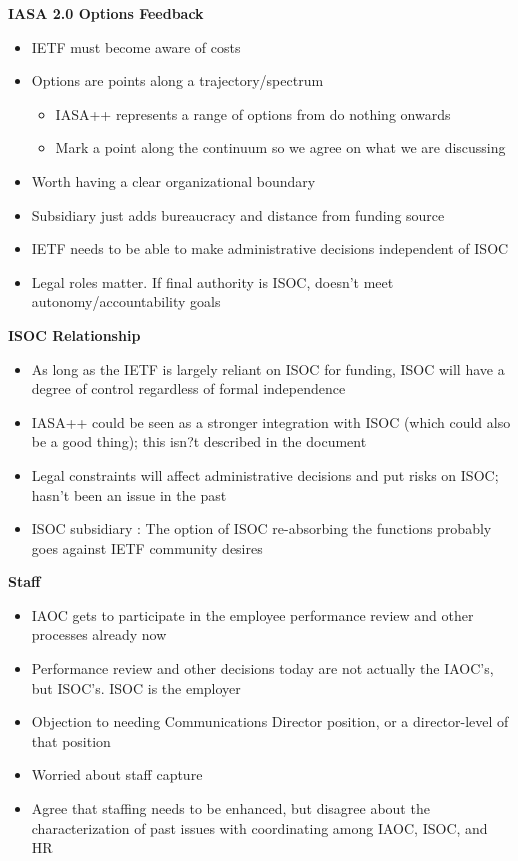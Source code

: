 \documentclass[helvetica,a4paper,landscape]{seminar}
\newcommand{\heading}[1]{%
  \begin{center} 
    \large\bf 
    #1 
  \end{center} 
  \vspace{.4 in}}
\begin{document}
\begin{slide}

\heading{IASA 2.0 Options Feedback}
{\footnotesize
\begin{itemize}
\item IETF must become aware of costs
\item Options are points along a trajectory/spectrum
\begin{itemize}
\item IASA++ represents a range of options from do nothing onwards
\item Mark a point along the continuum so we agree on what we are discussing
\end{itemize}
\item Worth having a clear organizational boundary
\item Subsidiary just adds bureaucracy and distance from funding source
\item IETF needs to be able to make administrative decisions independent of ISOC
\item Legal roles matter. If final authority is ISOC, doesn't meet autonomy/accountability goals 
\end{itemize}
}
\end{slide}

\begin{slide}

\heading{ISOC Relationship}
\begin{itemize}
\item As long as the IETF is largely reliant on ISOC for funding, ISOC will have a degree of control regardless of formal independence
\item IASA++ could be seen as a stronger integration with ISOC (which could also be a good thing); this isn?t described in the document
\item Legal constraints will affect administrative decisions and put risks on ISOC; hasn't been an issue in the past
\item ISOC subsidiary : The option of ISOC re-absorbing the functions probably goes against IETF community desires
\end{itemize}
\end{slide}

\begin{slide}
\heading{Staff}
\begin{itemize}
\item IAOC gets to participate in the employee performance review and other processes already now
\item Performance review and other decisions today are not actually the IAOC's, but ISOC's.  ISOC is the employer
\item Objection to needing Communications Director position, or a director-level of that position
\item Worried about staff capture
\item Agree that staffing needs to be enhanced, but disagree about the characterization of past issues with coordinating among IAOC, ISOC, and HR
\end{itemize}
\end{slide}
\end{document}
